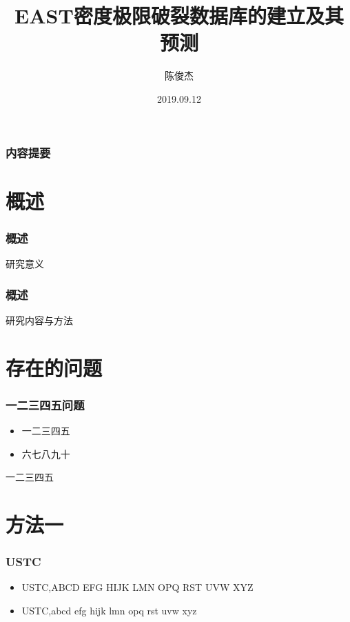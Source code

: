 \documentclass[8pt]{beamer}	%
\title{EAST密度极限破裂数据库的建立及其预测}	%
\author[陈俊杰]{陈俊杰}
\institute[中国科学技术大学]{{\normalsize 工程与应用物理系 \\ 中国科学技术大学，物理学院}}%
\date{2019.09.12}
\begin{document}
\begin{frame}[plain]
\titlepage
\end{frame}


\begin{frame}
\frametitle{内容提要}
\tableofcontents
\end{frame}


\section{概述}
\begin{frame}
\frametitle{概述}
研究意义
\end{frame}

\begin{frame}
\frametitle{概述}
研究内容与方法
\end{frame}

\section{存在的问题}

\begin{frame}
\frametitle{一二三四五问题}
\begin{itemize}
\item 一二三四五
\item \alert{六七八九十}
\end{itemize}
\pause
一二三四五

\end{frame}


\section{方法一}

\begin{frame}
\frametitle{USTC}

\begin{itemize}
\item<1-> USTC,ABCD EFG HIJK LMN OPQ RST UVW XYZ
\item<2-> USTC,abcd efg hijk lmn opq rst uvw xyz
\end{itemize}


\end{frame}
\end{document}

